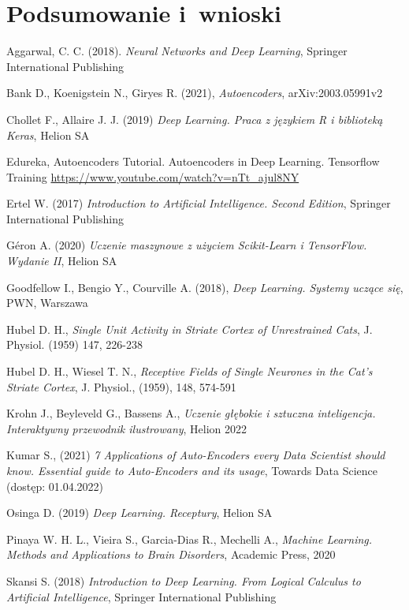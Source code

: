\documentclass[12pt]{mwbk}
\theoremstyle{plain}
\theoremstyle{definition}
\theoremstyle{remark}
\begin{document}
\chapter*{Podsumowanie i~wnioski}


\begin{thebibliography}{99}

 Aggarwal, C. C. (2018).\emph{ Neural Networks and Deep Learning}, Springer International Publishing

 Bank D., Koenigstein N., Giryes R. (2021), \emph{Autoencoders}, arXiv:2003.05991v2

 Chollet F., Allaire J. J. (2019) \emph{Deep Learning. Praca z językiem R i biblioteką Keras}, Helion SA

 Edureka, Autoencoders Tutorial. Autoencoders in Deep Learning. Tensorflow Training \url{https://www.youtube.com/watch?v=nTt_ajul8NY} 

 Ertel W. (2017) \emph{Introduction to Artificial Intelligence. Second Edition}, Springer International Publishing

 G\'eron A. (2020) \emph{Uczenie maszynowe z użyciem Scikit-Learn i TensorFlow. Wydanie II}, Helion SA

 Goodfellow I., Bengio Y., Courville A. (2018), \emph{Deep Learning. Systemy uczące się}, PWN, Warszawa 

 Hubel D. H., \emph{Single Unit Activity in  Striate Cortex of Unrestrained Cats}, J. Physiol. (1959) 147, 226-238

 Hubel D. H., Wiesel T. N., \emph{Receptive Fields of Single Neurones in the Cat's Striate Cortex}, J. Physiol., (1959), 148, 574-591

 Krohn J., Beyleveld G., Bassens A., \emph{Uczenie głębokie i sztuczna inteligencja. Interaktywny przewodnik ilustrowany}, Helion 2022

 Kumar S., (2021) \emph{7 Applications of Auto-Encoders every Data Scientist  should know. Essential guide to Auto-Encoders and its usage}, Towards Data Science (dostęp: 01.04.2022)

 Osinga D. (2019) \emph{Deep Learning. Receptury}, Helion SA

 Pinaya W. H. L., Vieira S., Garcia-Dias R., Mechelli A., \emph{Machine Learning. Methods and Applications to Brain Disorders}, Academic Press,
2020

 Skansi S. (2018) \emph{Introduction to Deep Learning. From Logical Calculus to Artificial Intelligence}, Springer International Publishing


\end{thebibliography}
\end{document}
